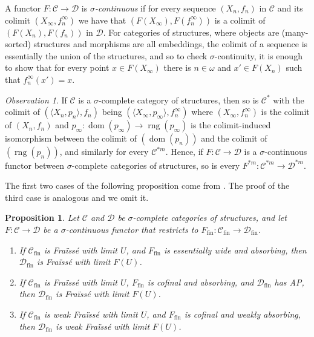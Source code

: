 \documentclass[10pt,a4paper]{article}
\newtheorem{prop}[tw]{Proposition}
\theoremstyle{definition}
\theoremstyle{remark}
\newtheorem{observation}[tw]{Observation}
\newcommand \seq [1]{\langle #1 \rangle}
\newcommand \maps {\colon} %
\newcommand \dom {\operatorname{dom}}
\newcommand \rng {\operatorname{rng}}
\newcommand \sig {\sigma}
\newcommand \C {\mathscr{C}}
\newcommand \D {\mathscr{D}}
\newcommand \fin {{\operatorname{fin}}}
\begin{document}
A functor $F\maps \C \to \D$ is {\it $\sigma$-continuous} if  for every sequence $(X_n, f_n)$ in $\C$ and its colimit $(X_\infty, f^\infty_n)$ we have that $(F(X_\infty), F(f^\infty_n))$ is a colimit of $(F(X_n), F(f_n))$ in $\D$.
For categories of structures, where objects are (many-sorted) structures and morphisms are all embeddings, the colimit of a sequence is essentially the union of the structures, and so to check $\sig$-continuity, it is enough to show that for every point $x \in F(X_\infty)$ there is $n \in \omega$ and $x' \in F(X_n)$ such that $f_n^\infty(x') = x$.



\begin{observation}
    If $\C$ is a $\sigma$-complete category of structures, then so is $\C^*$ with the colimit of $(\seq{X_n, p_n}, f_n)$ being $(\seq{X_\infty, p_\infty}, f^\infty_n)$ where $(X_\infty, f^\infty_n)$ is the colimit of $(X_n, f_n)$ and $p_\infty\maps \dom(p_\infty) \to \rng(p_\infty)$ is the colimit-induced isomorphism between the colimit of $(\dom(p_n))$ and the colimit of $(\rng(p_n))$, and similarly for every $\C^{*m}$.
    Hence, if $F\maps \C \to \D$ is a $\sigma$-continuous functor between $\sigma$-complete categories of structures, so is every $F^{*m}\maps \C^{*m} \to \D^{*m}$.
\end{observation}

The first two cases of the following proposition come from \cite[Proposition~3.8]{paper1}. The proof of the third case is analogous and we omit it.


\begin{prop} \label{thm:Flim_transfer}
    Let $\C$ and $\D$ be $\sigma$-complete categories of structures, and let $F\maps \C \to \D$ be a $\sigma$-continuous functor that restricts to $F_\fin\maps \C_\fin \to \D_\fin$.
    \begin{enumerate}
        \item If $\C_\fin$ is Fraïssé with limit $U$, and $F_\fin$ is essentially wide and absorbing, then $\D_\fin$ is Fraïssé with limit $F(U)$.
        
        \item If $\C_\fin$ is Fraïssé with limit $U$, $F_\fin$ is cofinal and absorbing, and $\D_\fin$ has AP, then $\D_\fin$ is Fraïssé with limit $F(U)$.
        
        \item If $\C_\fin$ is weak Fraïssé with limit $U$, and $F_\fin$ is cofinal and weakly absorbing, then $\D_\fin$ is weak Fraïssé with limit $F(U)$.
    \end{enumerate}
\end{prop}
\end{document}

